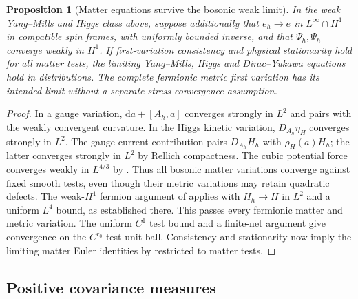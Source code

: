 \documentclass[11pt]{article}
\numberwithin{equation}{section}
\newtheorem{proposition}[proposition]{Proposition}
\theoremstyle{definition}
\theoremstyle{remark}
\newcommand{\dd}{\mathrm d}
\newcommand{\bPsi}{\overline\Psi}
\begin{document}
\begin{proposition}[Matter equations survive the bosonic weak limit]
\label{prop:weak-matter-equations}
In the weak Yang--Mills and Higgs class above, suppose additionally that
$e_h\to e$ in $L^\infty\cap H^1$ in compatible spin frames, with uniformly
bounded inverse, and that $\Psi_h,\bPsi_h$ converge weakly in $H^1$.
If first-variation consistency and physical stationarity hold for all matter
tests, the limiting Yang--Mills, Higgs and Dirac--Yukawa equations hold in
distributions.  The complete fermionic metric first variation has its
intended limit without a separate stress-convergence assumption.
\end{proposition}
\begin{proof}
In a gauge variation, $\dd a+[A_h,a]$ converges strongly in $L^2$ and pairs
with the weakly convergent curvature.  In the Higgs kinetic variation,
$D_{A_h}\eta_H$ converges strongly in $L^2$.  The gauge-current contribution
pairs $D_{A_h}H_h$ with $\rho_H(a)H_h$; the latter converges strongly in
$L^2$ by Rellich compactness.  The cubic potential force converges weakly
in $L^{4/3}$ by .  Thus all bosonic matter
variations converge against fixed smooth tests, even though their metric
variations may retain quadratic defects.
The weak-$H^1$ fermion argument of  applies with
$H_h\to H$ in $L^2$ and a uniform $L^4$ bound, as established there.
This passes every fermionic matter and metric variation.  The uniform
$C^1$ test bound and a finite-net argument give convergence on the
$C^{r_0}$ test unit ball.  Consistency and stationarity now imply the
limiting matter Euler identities by  restricted
to matter tests.
\end{proof}

\subsection{Positive covariance measures}
\end{document}
